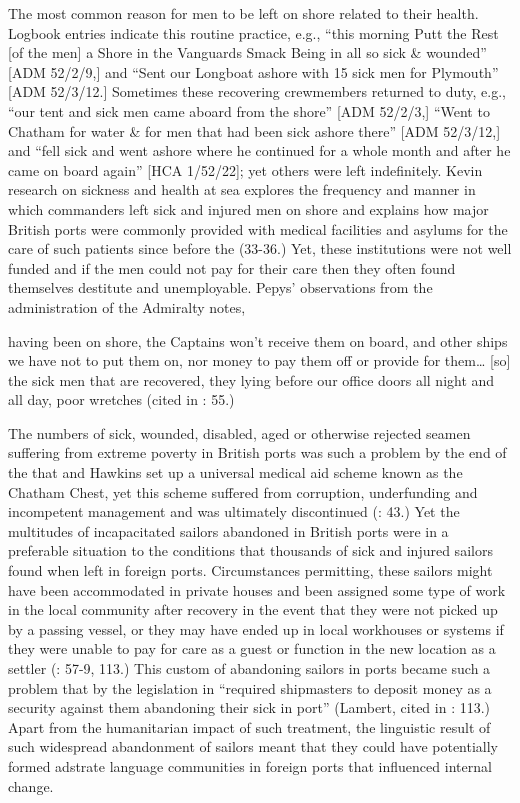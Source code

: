 The most common reason for men to be left on shore related to their health. Logbook entries indicate this routine practice, e.g., “this morning Putt the Rest [of the men] a Shore in the Vanguards Smack Being in all so sick \& wounded” [ADM 52/2/9,] and “Sent our Longboat ashore with 15 sick men for Plymouth” [ADM 52/3/12.] Sometimes these recovering crewmembers returned to duty, e.g., “our tent and sick men came aboard from the shore” [ADM 52/2/3,] “Went to Chatham for water \& for men that had been sick ashore there” [ADM 52/3/12,] and “fell sick and went ashore where he continued for a whole month and after he came on board again” [HCA 1/52/22]; yet others were left indefinitely. Kevin  research on sickness and health at sea explores the frequency and manner in which commanders left sick and injured men on shore and explains how major British ports were commonly provided with medical facilities and asylums for the care of such patients since before the  (33-36.) Yet, these institutions were not well funded and if the men could not pay for their care then they often found themselves destitute and unemployable. Pepys’ observations from the administration of the Admiralty notes, 

having been on shore, the Captains won’t receive them on board, and other ships we have not to put them on, nor money to pay them off or provide for them… [so] the sick men that are recovered, they lying before our office doors all night and all day, poor wretches (cited in \citealt{Brown2011}: 55.) 

The numbers of sick, wounded, disabled, aged or otherwise rejected seamen suffering from extreme poverty in British ports was such a problem by the end of the  that  and Hawkins set up a universal medical aid scheme known as the Chatham Chest, yet this scheme suffered from corruption, underfunding and incompetent management and was ultimately discontinued (\citealt{Brown2011}: 43.) Yet the multitudes of incapacitated sailors abandoned in British ports were in a preferable situation to the conditions that thousands of sick and injured sailors found when left in foreign ports. Circumstances permitting, these sailors might have been accommodated in private houses and been assigned some type of work in the local community after recovery in the event that they were not picked up by a passing vessel, or they may have ended up in local workhouses or  systems if they were unable to pay for care as a guest or function in the new location as a settler (\citealt{Brown2011}: 57-9, 113.) This custom of abandoning sailors in ports became such a problem that by the  legislation in  “required shipmasters to deposit money as a security against them abandoning their sick in port” (Lambert, cited in \citealt{Brown2011}: 113.) Apart from the humanitarian impact of such treatment, the linguistic result of such widespread abandonment of sailors meant that they could have potentially formed adstrate language communities in foreign ports that influenced internal change.

